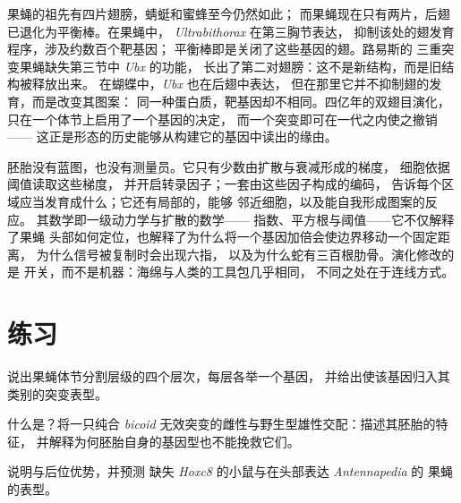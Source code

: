 \begin{example}[四翅]\label{ex:b3:developmental-genetics:four-wings}
果蝇的祖先有四片翅膀，蜻蜓和蜜蜂至今仍然如此；
而果蝇现在只有两片，后翅已退化为平衡棒。在果蝇中，
\emph{Ultrabithorax} 在第三胸节表达，
抑制该处的翅发育程序，涉及约数百个靶基因；
平衡棒即是关闭了这些基因的翅。路易斯的
三重突变果蝇缺失第三节中 \emph{Ubx} 的功能，
长出了第二对翅膀：这不是新结构，而是旧结构被释放出来。
在蝴蝶中，\emph{Ubx} 也在后翅中表达，
但在那里它并不抑制翅的发育，而是改变其图案：
同一种蛋白质，靶基因却不相同。四亿年的双翅目演化，
只在一个体节上启用了一个基因的决定，
而一个突变即可在一代之内使之撤销——
这正是形态的历史能够从构建它的基因中读出的缘由。
\end{example}

\begin{remark}[几何源于化学]\label{rem:b3:developmental-genetics:remark}
胚胎没有蓝图，也没有测量员。它只有少数由扩散与衰减形成的梯度，
细胞依据阈值读取这些梯度，
并开启转录因子；一套由这些因子构成的编码，
告诉每个区域应当发育成什么；它还有局部的，能够
邻近细胞，以及能自我形成图案的反应。
其数学即一级动力学与扩散的数学——
指数、平方根与阈值——它不仅解释了果蝇
头部如何定位，也解释了为什么将一个基因加倍会使边界移动一个固定距离，
为什么信号被复制时会出现六指，
以及为什么蛇有三百根肋骨。演化修改的是
开关，而不是机器：海绵与人类的工具包几乎相同，
不同之处在于连线方式。
\end{remark}

\section{练习}

\begin{exercise}[$\star$]\label{exo:b3:developmental-genetics:1}
说出果蝇体节分割层级的四个层次，每层各举一个基因，
并给出使该基因归入其类别的突变表型。
\end{exercise}

\begin{exercise}[$\star$]\label{exo:b3:developmental-genetics:2}
什么是？将一只纯合 \emph{bicoid}
无效突变的雌性与野生型雄性交配：描述其胚胎的特征，
并解释为何胚胎自身的基因型也不能挽救它们。
\end{exercise}

\begin{exercise}[$\star$]\label{exo:b3:developmental-genetics:3}
说明与后位优势，并预测
缺失 \emph{Hoxc8} 的小鼠与在头部表达 \emph{Antennapedia} 的
果蝇的表型。
\end{exercise}

